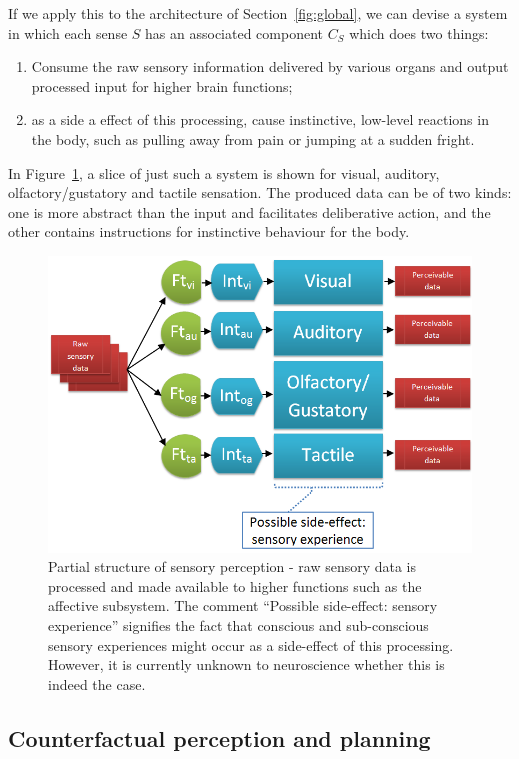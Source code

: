 \documentclass[]{scrartcl}
\theoremstyle{break}
\begin{document}
If we apply this to the architecture of Section~\ref{fig:global}, we can devise a system in which each sense $S$ has an associated component $C_S$ which does two things:
\begin{enumerate}
	\item Consume the raw sensory information delivered by various organs and output processed input for higher brain functions;
	\item as a side a effect of this processing, cause  instinctive, low-level reactions in the body, such as pulling away from pain or jumping at a sudden fright.
\end{enumerate}

In Figure~\ref{fig:sensoryPerception}, a slice of just such a system is shown for visual, auditory, olfactory/gustatory and tactile sensation. The produced data can be of two kinds: one is more abstract than the input and facilitates deliberative action, and the other contains instructions for instinctive behaviour for the body.

\begin{figure}[!h]
	\centering
	\includegraphics[width=325pt]{figs/sensoryPerception.png}
	\caption{Partial structure of sensory perception - raw sensory data is processed and made available to higher functions such as the affective subsystem. The comment ``Possible side-effect: sensory experience'' signifies the fact that conscious and sub-conscious sensory experiences might occur as a side-effect of this processing. However, it is currently unknown to neuroscience whether this is indeed the case.}
	\label{fig:sensoryPerception}
\end{figure}


\subsection{Counterfactual perception and planning}
\end{document}
